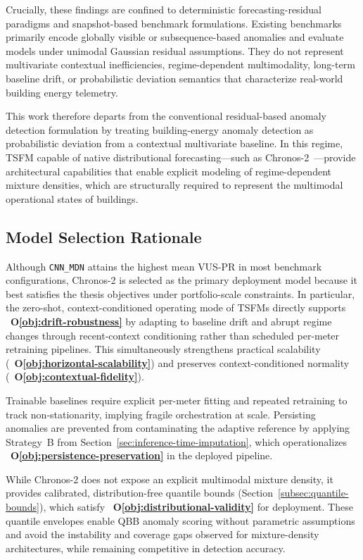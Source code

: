 Crucially, these findings are confined to deterministic forecasting-residual paradigms and
snapshot-based benchmark formulations. Existing benchmarks primarily encode globally visible or
subsequence-based anomalies and evaluate models under unimodal Gaussian residual assumptions.
They do not represent multivariate contextual inefficiencies, regime-dependent multimodality,
long-term baseline drift, or probabilistic deviation semantics that characterize real-world building
energy telemetry.

This work therefore departs from the conventional residual-based anomaly detection formulation by
treating building-energy anomaly detection as probabilistic deviation from a contextual multivariate
baseline. In this regime, \ac{TSFM} capable of native distributional forecasting—such as
Chronos-2~\parencite{ansari2025chronos}—provide architectural capabilities that enable explicit modeling of regime-dependent
mixture densities, which are structurally required to represent the multimodal operational states
of buildings.


\subsection{Model Selection Rationale}
\label{sec:model-selection-rationale}

Although \texttt{CNN\_\allowbreak MDN} attains the highest mean \ac{VUS-PR} in most benchmark
configurations, Chronos-2 is selected as the primary deployment model because it best
satisfies the thesis objectives under portfolio-scale constraints. In particular, the
zero-shot, context-conditioned operating mode of \acp{TSFM} directly supports
~\textbf{O\ref{obj:drift-robustness}} by adapting to baseline drift and abrupt
regime changes through recent-context conditioning rather than scheduled per-meter
retraining pipelines. This simultaneously strengthens practical scalability
(~\textbf{O\ref{obj:horizontal-scalability}}) and preserves context-conditioned
normality (~\textbf{O\ref{obj:contextual-fidelity}}).

Trainable baselines require explicit per-meter fitting and repeated retraining to track
non-stationarity, implying fragile orchestration at scale. Persisting anomalies are
prevented from contaminating the adaptive reference by applying Strategy~B from
Section~\ref{sec:inference-time-imputation}, which operationalizes
~\textbf{O\ref{obj:persistence-preservation}} in the deployed pipeline.

While Chronos-2 does not expose an explicit multimodal mixture density, it provides
calibrated, distribution-free quantile bounds (Section~\ref{subsec:quantile-bounds}),
which satisfy ~\textbf{O\ref{obj:distributional-validity}} for deployment. These
quantile envelopes enable \ac{QBB} anomaly scoring without parametric assumptions and
avoid the instability and coverage gaps observed for mixture-density architectures,
while remaining competitive in detection accuracy.

